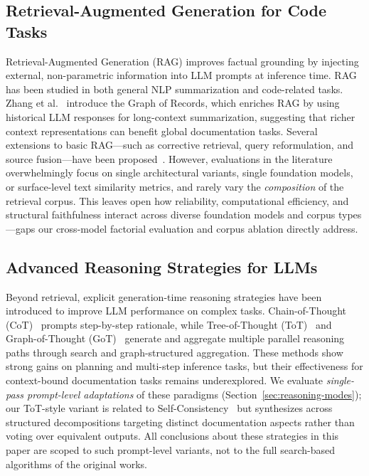 \documentclass[pdflatex,sn-mathphys-ay]{sn-jnl}%
\theoremstyle{thmstyleone}%
\theoremstyle{thmstyletwo}%
\theoremstyle{thmstylethree}%
\begin{document}
\subsection{Retrieval-Augmented Generation for Code Tasks}
Retrieval-Augmented Generation (RAG) improves factual grounding by injecting external, non-parametric information into LLM prompts at inference time. RAG has been studied in both general NLP summarization and code-related tasks. Zhang et al.~\cite{zhang-etal-2025-graph} introduce the Graph of Records, which enriches RAG by using historical LLM responses for long-context summarization, suggesting that richer context representations can benefit global documentation tasks. Several extensions to basic RAG---such as corrective retrieval, query reformulation, and source fusion---have been proposed~\cite{codereview}. However, evaluations in the literature overwhelmingly focus on single architectural variants, single foundation models, or surface-level text similarity metrics, and rarely vary the \emph{composition} of the retrieval corpus. This leaves open how reliability, computational efficiency, and structural faithfulness interact across diverse foundation models and corpus types---gaps our cross-model factorial evaluation and corpus ablation directly address.

\subsection{Advanced Reasoning Strategies for LLMs}
Beyond retrieval, explicit generation-time reasoning strategies have been introduced to improve LLM performance on complex tasks. Chain-of-Thought (CoT)~\cite{cot} prompts step-by-step rationale, while Tree-of-Thought (ToT)~\cite{tot} and Graph-of-Thought (GoT)~\cite{got} generate and aggregate multiple parallel reasoning paths through search and graph-structured aggregation. These methods show strong gains on planning and multi-step inference tasks, but their effectiveness for context-bound documentation tasks remains underexplored. We evaluate \emph{single-pass prompt-level adaptations} of these paradigms (Section~\ref{sec:reasoning-modes}); our ToT-style variant is related to Self-Consistency~\cite{wang2023selfconsistency} but synthesizes across structured decompositions targeting distinct documentation aspects rather than voting over equivalent outputs. All conclusions about these strategies in this paper are scoped to such prompt-level variants, not to the full search-based algorithms of the original works.
\end{document}
